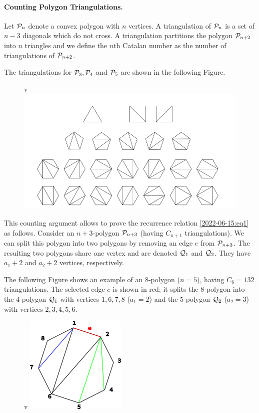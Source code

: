 \paragraph{Counting Polygon Triangulations.} Let $\mathcal{P}_n$ denote a convex polygon with $n$ vertices. A triangulation of $\mathcal{P}_n$ is a set of $n-3$ diagonals which do not cross. A triangulation partitions the polygon $\mathcal{P}_{n+2}$ into $n$ triangles and we define the $n$th Catalan number as the number of triangulations of $\mathcal{P}_{n+2}$.

The triangulations for $\mathcal{P}_3, \mathcal{P}_4$ and $\mathcal{P}_5$ are shown in the following Figure.

\begin{figure}[H]v
\centering
\includegraphics[scale=0.5]{images/2022-06-15-catalan_01.png}
\end{figure}

This counting argument allows to prove the recurrence relation \eqref{2022-06-15:eq1} as follows. Consider an $n+3$-polygon $\mathcal{P}_{n+3}$ (having $C_{n+1}$ triangulations). We can split this polygon into two polygons by removing an edge $e$ from $\mathcal{P}_{n+3}$. The resulting two polygons share one vertex and are denoted $\mathcal{Q}_1$ and $\mathcal{Q}_2$. They have $a_1+2$ and $a_2+2$ vertices, respectively. 

The following Figure shows an example of an $8$-polygon ($n=5$), having $C_6 = 132$ triangulations. The selected edge $e$ is shown in red; it splits the $8$-polygon into the $4$-polygon $\mathcal{Q}_1$ with vertices $1,6,7,8$ ($a_1=2$) and the $5$-polygon $\mathcal{Q}_2$ ($a_2=3$) with vertices $2,3,4,5,6$.

\begin{figure}[H]v
\centering
\includegraphics[scale=1.0]{images/2022-06-15-catalan_02.png}
\end{figure}


